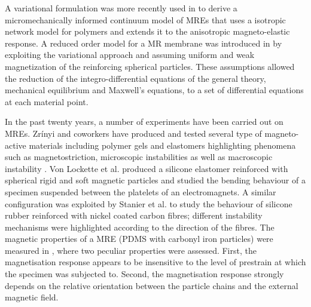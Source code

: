 \documentclass[oneside]{article}
\begin{document}
A variational formulation was more recently used in \cite{Ethiraj2016} to derive a micromechanically informed continuum model of MREs that uses a isotropic network model for polymers and extends it to the anisotropic magneto-elastic response. A reduced order model for a MR membrane was introduced in \cite{Barham2007} by exploiting the variational approach and assuming uniform and weak magnetization of the reinforcing spherical particles. These assumptions allowed the reduction of the integro-differential equations of the general theory, mechanical equilibrium and Maxwell's equations, to a set of differential equations at each material point.

In the past twenty years, a number of experiments have been carried out on MREs. Zr\'inyi and coworkers have produced and tested several type of magneto-active materials including polymer gels \cite{Zrinyi1996,Szabo1998} and elastomers \cite{Varga2006} highlighting phenomena such as magnetostriction, microscopic instabilities \cite{Varga2006} as well as macroscopic instability \cite{Szabo1998}. Von Lockette et al. \cite{VonLockette2011} produced a silicone elastomer reinforced with spherical rigid and soft magnetic particles and studied the bending behaviour of a specimen suspended between the platelets of an electromagnets. A similar configuration was exploited by Stanier et al. \cite{Stanier2016} to study the behaviour of silicone rubber reinforced with nickel coated carbon fibres; different instability mechanisms were highlighted according to the direction of the fibres. The magnetic properties of a MRE (PDMS with carbonyl iron particles) were measured in \cite{Danas2012}, where two peculiar properties were assessed. First, the magnetisation response appears to be insensitive to the level of prestrain at which the specimen was subjected to.   
Second, the magnetisation response strongly depends on the relative orientation between the particle chains and the external magnetic field.
\end{document}
